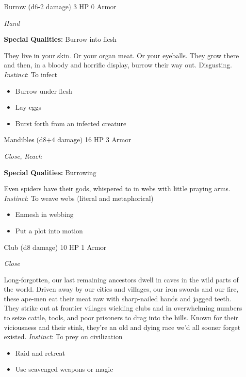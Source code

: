 \newpage
\HRule
{}
Burrow (d6-2 damage) \hspace*{\fill}3 HP 0 Armor

\emph{Hand}

\textbf{Special Qualities:}
Burrow into flesh

\HRule
They live in your skin. Or your organ meat. Or your eyeballs. They grow there and then, in a bloody and horrific display, burrow their way out. Disgusting. \emph{Instinct}: To infect
\begin{itemize}
\item Burrow under flesh
\item Lay eggs
\item Burst forth from an infected creature
\end{itemize}

\HRule
{}

Mandibles (d8+4 damage) \hspace*{\fill}16 HP 3 Armor

\emph{Close, Reach}

\textbf{Special Qualities:}
Burrowing

\HRule
Even spiders have their gods, whispered to in webs with little praying arms. \emph{Instinct}: To weave webs (literal and metaphorical)
\begin{itemize}
\item Enmesh in webbing
\item Put a plot into motion
\end{itemize}
\newpage
\HRule
{}

Club (d8 damage) \hspace*{\fill}10 HP 1 Armor

\emph{Close}

\HRule
Long-forgotten, our last remaining ancestors dwell in caves in the wild parts of the world. Driven away by our cities and villages, our iron swords and our fire, these ape-men eat their meat raw with sharp-nailed hands and jagged teeth. They strike out at frontier villages wielding clubs and in overwhelming numbers to seize cattle, tools, and poor prisoners to drag into the hills. Known for their viciousness and their stink, they're an old and dying race we'd all sooner forget existed. \emph{Instinct}: To prey on civilization
\begin{itemize}
\item Raid and retreat
\item Use scavenged weapons or magic
\end{itemize}
